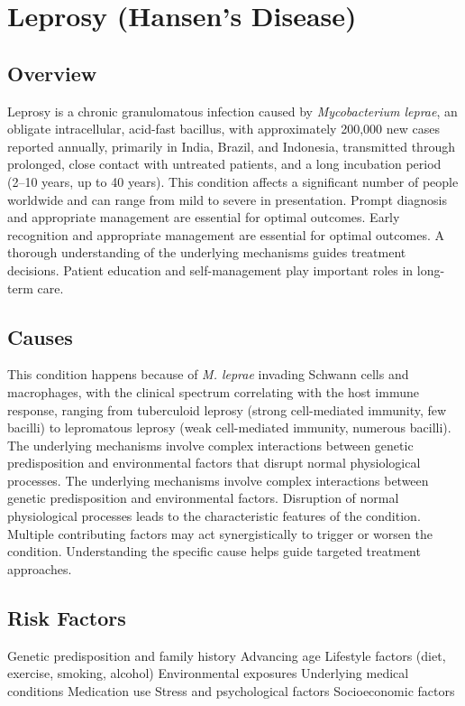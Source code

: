 \chapter{Leprosy (Hansen's Disease)}
\label{sec:Leprosy}

\section{Overview}
Leprosy is a chronic granulomatous infection caused by \textit{Mycobacterium leprae}, an obligate intracellular, acid-fast bacillus, with approximately 200,000 new cases reported annually, primarily in India, Brazil, and Indonesia, transmitted through prolonged, close contact with untreated patients, and a long incubation period (2--10 years, up to 40 years). This condition affects a significant number of people worldwide and can range from mild to severe in presentation. Prompt diagnosis and appropriate management are essential for optimal outcomes. Early recognition and appropriate management are essential for optimal outcomes. A thorough understanding of the underlying mechanisms guides treatment decisions. Patient education and self-management play important roles in long-term care.
\section{Causes}
This condition happens because of \textit{M. leprae} invading Schwann cells and macrophages, with the clinical spectrum correlating with the host immune response, ranging from tuberculoid leprosy (strong cell-mediated immunity, few bacilli) to lepromatous leprosy (weak cell-mediated immunity, numerous bacilli). The underlying mechanisms involve complex interactions between genetic predisposition and environmental factors that disrupt normal physiological processes. The underlying mechanisms involve complex interactions between genetic predisposition and environmental factors. Disruption of normal physiological processes leads to the characteristic features of the condition. Multiple contributing factors may act synergistically to trigger or worsen the condition. Understanding the specific cause helps guide targeted treatment approaches.
\section{Risk Factors}
Genetic predisposition and family history Advancing age Lifestyle factors (diet, exercise, smoking, alcohol) Environmental exposures Underlying medical conditions Medication use Stress and psychological factors Socioeconomic factors

